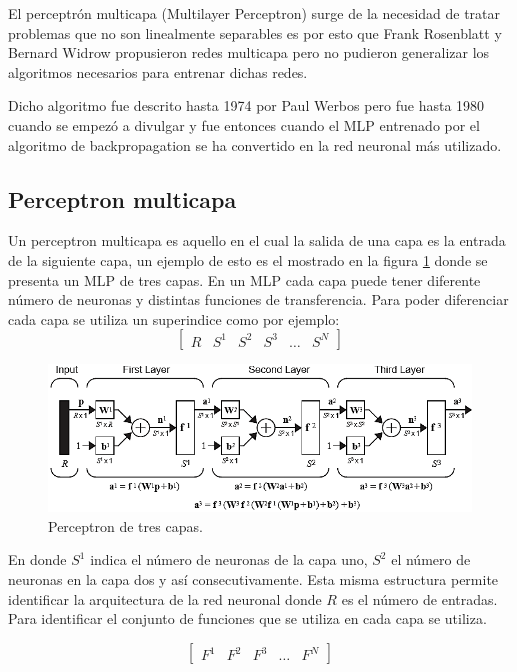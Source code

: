 \documentclass[12pt, titlepage]{article}
\begin{document}
El perceptrón multicapa (Multilayer Perceptron) surge de la necesidad de tratar problemas que no son linealmente separables es por esto que Frank Rosenblatt y Bernard Widrow propusieron redes multicapa pero no pudieron generalizar los algoritmos necesarios para entrenar dichas redes.

Dicho algoritmo fue descrito hasta 1974 por Paul Werbos pero fue hasta 1980 cuando se empezó a divulgar y fue entonces cuando el MLP entrenado por el algoritmo de backpropagation se ha convertido en la red neuronal más utilizado. \cite{libro1}
\subsection{Perceptron multicapa}
Un perceptron multicapa es aquello en el cual la salida de una capa es la entrada de la siguiente capa, un ejemplo de esto es el mostrado en la figura \ref{fig:MLP} donde se presenta un MLP de tres capas. En un MLP cada capa puede tener diferente número de neuronas y distintas funciones de transferencia. Para poder diferenciar cada capa se utiliza un superindice como por ejemplo:
\[ \begin{bmatrix} R & S^1 & S^2 & S^3 & \dots & S^N \end{bmatrix} \]

\begin{figure}[H]
    \begin{center}
        \includegraphics[width=16cm]{img/MLP.png}
        \caption{Perceptron de tres capas. \cite{libro1}}
        \label{fig:MLP}
    \end{center}
\end{figure}

En donde $S^1$ indica el número de neuronas de la capa uno, $S^2$ el número de neuronas en la capa dos y así consecutivamente. Esta misma estructura permite identificar la arquitectura de la red neuronal donde $R$ es el número de entradas. Para identificar el conjunto de funciones que se utiliza en cada capa se utiliza.

\[ \begin{bmatrix} F^1 & F^2 & F^3 & \dots & F^N \end{bmatrix} \]
\end{document}
